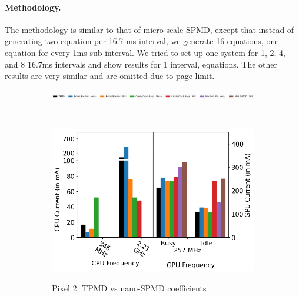 \paragraph{Methodology.}
The methodology is similar to that of micro-scale SPMD, except that
instead of generating two equation per 16.7 ms interval, we generate
16 equations, \ie one equation for every 1ms sub-interval.  We tried
to set up one system for 1, 2, 4, and 8 16.7ms intervals and show results for 1
interval,  equations.  The other results are
very similar and are omitted due to page limit.
\begin{figure}[tp]
    \centering
     \begin{subfigure}[b]{\textwidth}
         \centering
         \includegraphics[width=\textwidth]{figures/label_macro_equations.png}
    \end{subfigure}
    \\
    \centering
     \begin{subfigure}[b]{0.32\textwidth}
         \centering
         \includegraphics[width=\textwidth]{figures/002_Pixel2_1_nano_equations.png}
         \label{fig:nano_equations_p2}
         \vspace{-0.25in}
         \caption{Pixel 2: TPMD vs nano-SPMD coefficients}
     \end{subfigure}
    \begin{subfigure}[b]{0.32\textwidth}
         \centering

\end{subfigure}
\end{figure}
